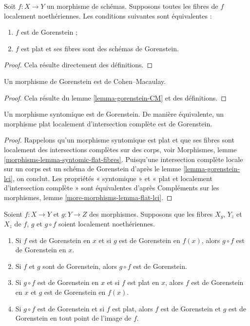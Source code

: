 \begin{lemma}
\label{lemma-gorenstein-morphism}
Soit $f : X \to Y$ un morphisme de schémas. Supposons toutes les fibres de $f$ localement noethériennes. Les conditions suivantes sont équivalentes :
\begin{enumerate}
\item $f$ est de Gorenstein ;
\item $f$ est plat et ses fibres sont des schémas de Gorenstein.
\end{enumerate}
\end{lemma}

\begin{proof}
Cela résulte directement des définitions.
\end{proof}

\begin{lemma}
\label{lemma-gorenstein-CM-morphism}
Un morphisme de Gorenstein est de Cohen–Macaulay.
\end{lemma}

\begin{proof}
Cela résulte du lemme \ref{lemma-gorenstein-CM} et des définitions.
\end{proof}

\begin{lemma}
\label{lemma-lci-gorenstein}
Un morphisme syntomique est de Gorenstein. De manière équivalente, un morphisme plat localement d'intersection complète est de Gorenstein.
\end{lemma}

\begin{proof}
Rappelons qu'un morphisme syntomique est plat et que ses fibres sont localement des intersections complètes sur des corps, voir Morphismes, lemme \ref{morphisms-lemma-syntomic-flat-fibres}. Puisqu'une intersection complète locale sur un corps est un schéma de Gorenstein d'après le lemme \ref{lemma-gorenstein-lci}, on conclut. Les propriétés « syntomique » et « plat et localement d'intersection complète » sont équivalentes d'après Compléments sur les morphismes, lemme \ref{more-morphisms-lemma-flat-lci}.
\end{proof}

\begin{lemma}
\label{lemma-composition-gorenstein}
Soient $f : X \to Y$ et $g : Y \to Z$ des morphismes. Supposons que les fibres $X_y$, $Y_z$ et $X_z$ de $f$, $g$ et $g \circ f$ soient localement noethériennes.
\begin{enumerate}
\item Si $f$ est de Gorenstein en $x$ et si $g$ est de Gorenstein en $f(x)$, alors $g \circ f$ est de Gorenstein en $x$.
\item Si $f$ et $g$ sont de Gorenstein, alors $g \circ f$ est de Gorenstein.
\item Si $g \circ f$ est de Gorenstein en $x$ et si $f$ est plat en $x$, alors $f$ est de Gorenstein en $x$ et $g$ est de Gorenstein en $f(x)$.
\item Si $g \circ f$ est de Gorenstein et si $f$ est plat, alors $f$ est de Gorenstein et $g$ est de Gorenstein en tout point de l'image de $f$.
\end{enumerate}
\end{lemma}

